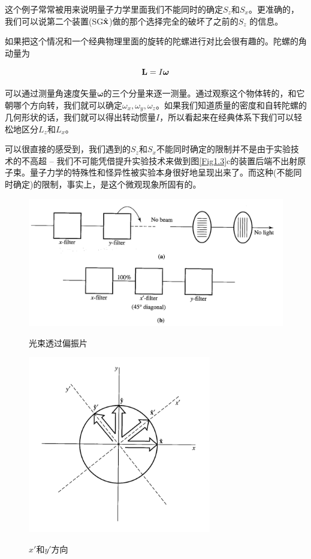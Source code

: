 \documentclass[UTF8,twoside]{ctexart}
\begin{document}
这个例子常常被用来说明量子力学里面我们不能同时的确定$S_z$和$S_x$。更准确的，我们可以说第二个装置(SG$\hat{\bf x}$)做的那个选择完全的破坏了之前的$S_z$ 的信息。

如果把这个情况和一个经典物理里面的旋转的陀螺进行对比会很有趣的。陀螺的角动量为

\begin{equation}
{\bf L} = I\bm\omega
\end{equation}

\noindent 可以通过测量角速度矢量$\bm \omega$的三个分量来逐一测量。通过观察这个物体转的，和它朝哪个方向转，我们就可以确定$\omega_x, \omega_y, \omega_z$。如果我们知道质量的密度和自转陀螺的几何形状的话，我们就可以得出转动惯量$I$，所以看起来在经典体系下我们可以轻松地区分$L_z$和$L_x$。

可以很直接的感受到，我们遇到的$S_z$和$S_x$不能同时确定的限制并不是由于实验技术的不高超 -- 我们不可能凭借提升实验技术来做到图{\ref{Fig1.3}}c的装置后端不出射原子束。量子力学的特殊性和怪异性被实验本身很好地呈现出来了。而这种(不能同时确定)的限制，事实上，是这个微观现象所固有的。\\


\begin{figure}
\begin{centering}
\includegraphics[width = 12cm]{./Sakurai/Fig_1.4.png}
\caption{光束透过偏振片}
\label {Fig1.4}
\includegraphics[width = 8cm]{./Sakurai/Fig_1.5.png}
\caption{$x'$和$y'$方向}
\label {Fig1.5}
\end{centering}
\end{figure}
\end{document}
